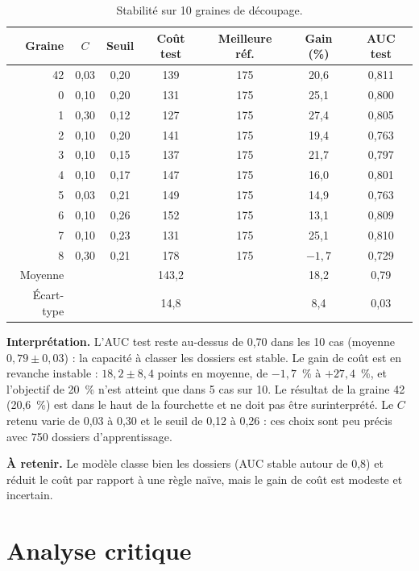 \documentclass[11pt,a4paper]{article}
\begin{document}
\begin{table}[htbp]
\centering
\caption{Stabilité sur 10 graines de découpage.}
\small
\begin{tabular}{@{}rcccccc@{}}
\toprule
\textbf{Graine} & $C$ & \textbf{Seuil} & \textbf{Coût test} & \textbf{Meilleure réf.} & \textbf{Gain (\%)} & \textbf{AUC test}\\
\midrule
42 & 0,03 & 0,20 & 139 & 175 & 20,6 & 0,811\\
0 & 0,10 & 0,20 & 131 & 175 & 25,1 & 0,800\\
1 & 0,30 & 0,12 & 127 & 175 & 27,4 & 0,805\\
2 & 0,10 & 0,20 & 141 & 175 & 19,4 & 0,763\\
3 & 0,10 & 0,15 & 137 & 175 & 21,7 & 0,797\\
4 & 0,10 & 0,17 & 147 & 175 & 16,0 & 0,801\\
5 & 0,03 & 0,21 & 149 & 175 & 14,9 & 0,763\\
6 & 0,10 & 0,26 & 152 & 175 & 13,1 & 0,809\\
7 & 0,10 & 0,23 & 131 & 175 & 25,1 & 0,810\\
8 & 0,30 & 0,21 & 178 & 175 & $-1{,}7$ & 0,729\\
\midrule
Moyenne & & & 143,2 & & 18,2 & 0,79\\
Écart-type & & & 14,8 & & 8,4 & 0,03\\
\bottomrule
\end{tabular}
\end{table}

\textbf{Interprétation.} L'AUC test reste au-dessus de 0,70 dans les 10 cas (moyenne $0{,}79 \pm 0{,}03$) : la capacité à classer les dossiers est stable. Le gain de coût est en revanche instable : $18{,}2 \pm 8{,}4$ points en moyenne, de $-1{,}7$~\% à $+27{,}4$~\%, et l'objectif de 20~\% n'est atteint que dans 5 cas sur 10. Le résultat de la graine 42 (20,6~\%) est dans le haut de la fourchette et ne doit pas être surinterprété. Le $C$ retenu varie de 0,03 à 0,30 et le seuil de 0,12 à 0,26 : ces choix sont peu précis avec 750 dossiers d'apprentissage.

\textbf{À retenir.} Le modèle classe bien les dossiers (AUC stable autour de 0,8) et réduit le coût par rapport à une règle naïve, mais le gain de coût est modeste et incertain.

\section{Analyse critique}
\end{document}
